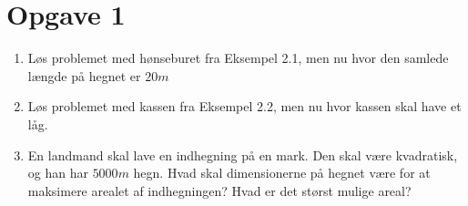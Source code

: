 \section*{Opgave 1}
\begin{enumerate}[label=\roman*)]
\item Løs problemet med hønseburet fra Eksempel 2.1, men nu hvor den samlede længde på hegnet er $20m$
\item Løs problemet med kassen fra Eksempel 2.2, men nu hvor kassen skal have et låg.
\item En landmand skal lave en indhegning på en mark. Den skal være kvadratisk, og han har $5000m$ hegn. Hvad skal dimensionerne på hegnet være for at maksimere arealet af indhegningen? Hvad er det størst mulige areal?
\end{enumerate}